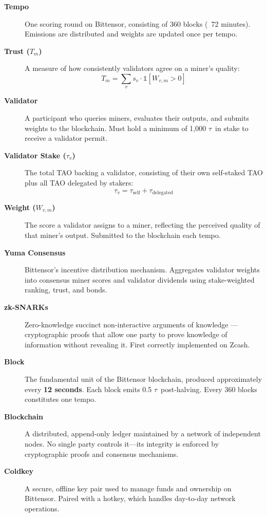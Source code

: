 \documentclass[12pt, a4paper, oneside]{report}
\newcommand{\TAO}{$\tau$}            %
\theoremstyle{definition}
\begin{document}
\begin{description}
  \item[\textbf{Tempo}] One scoring round on Bittensor, consisting of 360 
  blocks (~72 minutes). Emissions are distributed and weights are updated 
  once per tempo.

  \item[\textbf{Trust ($T_m$)}] A measure of how consistently validators agree 
  on a miner's quality:
  \[
    T_m = \sum_v s_v \cdot \mathbb{1}[W_{v,m} > 0]
  \]

  \item[\textbf{Validator}] A participant who queries miners, evaluates their 
  outputs, and submits weights to the blockchain. Must hold a minimum of 
  1,000 \TAO\ in stake to receive a validator permit.

  \item[\textbf{Validator Stake ($\tau_v$)}] The total TAO backing a validator, 
  consisting of their own self-staked TAO plus all TAO delegated by stakers:
  \[
    \tau_v = \tau_{\text{self}} + \tau_{\text{delegated}}
  \]

  \item[\textbf{Weight ($W_{v,m}$)}] The score a validator assigns to a miner, 
  reflecting the perceived quality of that miner's output. Submitted to the 
  blockchain each tempo.

  \item[\textbf{Yuma Consensus}] Bittensor's incentive distribution mechanism. 
  Aggregates validator weights into consensus miner scores and validator 
  dividends using stake-weighted ranking, trust, and bonds.

  \item[\textbf{zk-SNARKs}] Zero-knowledge succinct non-interactive arguments 
  of knowledge — cryptographic proofs that allow one party to prove knowledge 
  of information without revealing it. First correctly implemented on Zcash.

  \item[\textbf{Block}] The fundamental unit of the Bittensor blockchain, 
  produced approximately every \textbf{12 seconds}. Each block emits 
  0.5 \TAO\ post-halving. Every 360 blocks constitutes one tempo.

  \item[\textbf{Blockchain}] A distributed, append-only ledger maintained 
  by a network of independent nodes. No single party controls it—its 
  integrity is enforced by cryptographic proofs and consensus mechanisms.

  \item[\textbf{Coldkey}] A secure, offline key pair used to manage funds 
  and ownership on Bittensor. Paired with a hotkey, which handles 
  day-to-day network operations.


\end{description}
\end{document}
